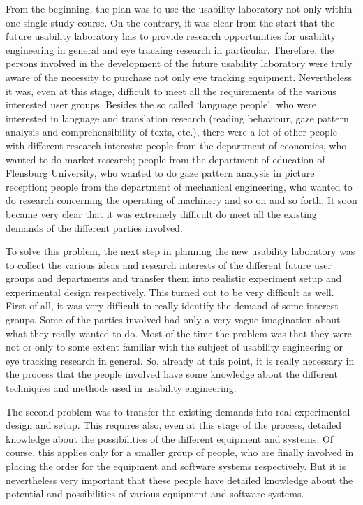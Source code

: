 \documentclass[output=paper]{langsci/langscibook}
\begin{document}
From the beginning, the plan was to use the usability laboratory not only within one single study course. On the contrary, it was clear from the start that the future usability laboratory has to provide research opportunities for usability engineering in general and eye tracking research in particular. Therefore, the persons involved in the development of the future usability laboratory were truly aware of the necessity to purchase not only eye tracking equipment. Nevertheless it was, even at this stage, difficult to meet all the requirements of the various interested user groups. Besides the so called `language people', who were interested in language and translation research (reading behaviour, gaze pattern analysis and comprehensibility of texts, etc.), there were a lot of other people with different research interests: people from the department of economics, who wanted to do market research; people from the department of education of Flensburg University, who wanted to do gaze pattern analysis in picture reception; people from the department of mechanical engineering, who wanted to do research concerning the operating of machinery and so on and so forth. It soon became very clear that it was extremely difficult do meet all the existing demands of the different parties involved.



To solve this problem, the next step in planning the new usability laboratory was to collect the various ideas and research interests of the different future user groups and departments and transfer them into realistic experiment setup and experimental design respectively. This turned out to be very difficult as well. First of all, it was very difficult to really identify the demand of some interest groups. Some of the parties involved had only a very vague imagination about what they really wanted to do. Most of the time the problem was that they were not or only to some extent familiar with the subject of usability engineering or eye tracking research in general. So, already at this point, it is really necessary in the process that the people involved have some knowledge about the different techniques and methods used in usability engineering. 



The second problem was to transfer the existing demands into real experimental design and setup. This requires also, even at this stage of the process, detailed knowledge about the possibilities of the different equipment and systems. Of course, this applies only for a smaller group of people, who are finally involved in placing the order for the equipment and software systems respectively. But it is nevertheless very important that these people have detailed knowledge about the potential and possibilities of various equipment and software systems. 
\end{document}
